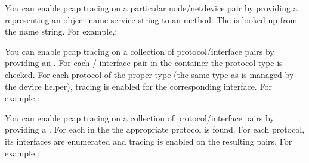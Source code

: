 \documentclass[letterpaper,10pt,english]{sphinxmanual}
\renewcommand{\sphinxcode}[1]{\texttt{\small{#1}}}
\begin{document}
You can enable pcap tracing on a particular node/net\sphinxhyphen{}device pair by providing a
\sphinxcode{} representing an object name service string to an \sphinxcode{}
method.  The \sphinxcode{} is looked up from the name string.  For example,:

\begin{sphinxVerbatim}[commandchars=\\\{\}]
  
   
\end{sphinxVerbatim}

You can enable pcap tracing on a collection of protocol/interface pairs by
providing an \sphinxcode{}. For each \sphinxcode{} / interface pair in
the container the protocol type is checked. For each protocol of the proper type
(the same type as is managed by the device helper), tracing is enabled for the
corresponding interface.  For example,:

\begin{sphinxVerbatim}[commandchars=\\\{\}]
 
    
 
  
    
  
\end{sphinxVerbatim}

You can enable pcap tracing on a collection of protocol/interface pairs by
providing a \sphinxcode{}. For each \sphinxcode{} in the \sphinxcode{} the
appropriate protocol is found. For each protocol, its interfaces are enumerated
and tracing is enabled on the resulting pairs. For example,:
\end{document}
